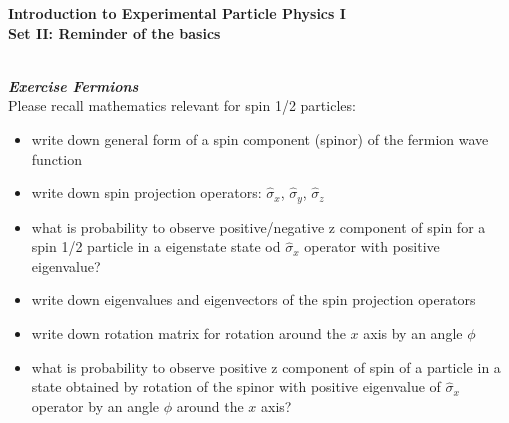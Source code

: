 \documentclass[11pt,a4paper]{article}
\newcounter{zadanie}\newcommand{\zadanie}[1][]{\addtocounter{zadanie}{1} ~\\  {\bf \emph{Exercise \arabic{zadanie} #1 }} \\}
\begin{document}
         

\begin{centering}
  {\bf {\Large
 Introduction to Experimental Particle Physics I \\
  Set II: Reminder of the basics
  }} \\  
\end{centering}

\vspace{1cm}
\zadanie[Fermions]

Please recall mathematics relevant for spin 1/2 particles:

\begin{itemize}
    \item write down general form of a spin component (spinor) of the fermion wave function
    \item write down spin projection operators: 
    $\hat{\sigma}_x$, $\hat{\sigma}_y$, $\hat{\sigma}_z$
    \item what is probability to observe positive/negative z component of spin 
    for a spin 1/2 particle in a eigenstate state od $\hat{\sigma}_x$ 
    operator with positive eigenvalue?
    \item write down eigenvalues and eigenvectors of the spin projection operators
    \item write down rotation matrix for rotation around the $x$ axis by an 
          angle $\phi$ 
    \item what is probability to observe positive z component of spin
          of a particle in a state obtained by rotation of the spinor with 
          positive eigenvalue of $\hat{\sigma}_x$ operator by an angle $\phi$ 
          around the $x$ axis? 
\end{itemize}
\end{document}
